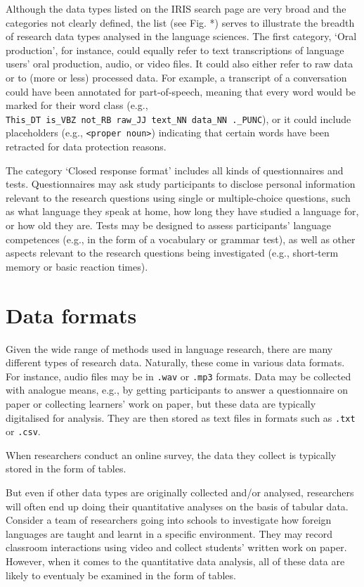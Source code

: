 \documentclass[
  letterpaper,
  DIV=11,
  numbers=noendperiod]{scrreprt}
\begin{document}
Although the data types listed on the IRIS search page are very broad
and the categories not clearly defined, the list (see Fig. *) serves to
illustrate the breadth of research data types analysed in the language
sciences. The first category, `Oral production', for instance, could
equally refer to text transcriptions of language users' oral production,
audio, or video files. It could also either refer to raw data or to
(more or less) processed data. For example, a transcript of a
conversation could have been annotated for part-of-speech, meaning that
every word would be marked for their word class (e.g.,
\texttt{This\_DT\ is\_VBZ\ not\_RB\ raw\_JJ\ text\_NN\ data\_NN\ .\_PUNC}),
or it could include placeholders (e.g.,
\texttt{\textless{}proper\ noun\textgreater{}}) indicating that certain
words have been retracted for data protection reasons.

The category `Closed response format' includes all kinds of
questionnaires and tests. Questionnaires may ask study participants to
disclose personal information relevant to the research questions using
single or multiple-choice questions, such as what language they speak at
home, how long they have studied a language for, or how old they are.
Tests may be designed to assess participants' language competences
(e.g., in the form of a vocabulary or grammar test), as well as other
aspects relevant to the research questions being investigated (e.g.,
short-term memory or basic reaction times).

\section{Data formats}\label{data-formats}

Given the wide range of methods used in language research, there are
many different types of research data. Naturally, these come in various
data formats. For instance, audio files may be in \texttt{.wav} or
\texttt{.mp3} formats. Data may be collected with analogue means, e.g.,
by getting participants to answer a questionnaire on paper or collecting
learners' work on paper, but these data are typically digitalised for
analysis. They are then stored as text files in formats such as
\texttt{.txt} or \texttt{.csv}.

When researchers conduct an online survey, the data they collect is
typically stored in the form of tables.

But even if other data types are originally collected and/or analysed,
researchers will often end up doing their quantitative analyses on the
basis of tabular data. Consider a team of researchers going into schools
to investigate how foreign languages are taught and learnt in a specific
environment. They may record classroom interactions using video and
collect students' written work on paper. However, when it comes to the
quantitative data analysis, all of these data are likely to eventualy be
examined in the form of tables.
\end{document}
